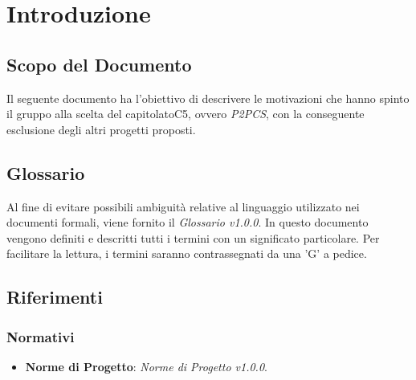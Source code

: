\section{Introduzione}
\subsection{Scopo del Documento}
	Il seguente documento ha l'obiettivo di descrivere le motivazioni che hanno spinto il gruppo alla scelta del capitolato\glosp C5, ovvero \textit{P2PCS}, con la conseguente esclusione degli altri progetti proposti.
	
\subsection{Glossario}
Al fine di evitare possibili ambiguità relative al linguaggio utilizzato nei documenti formali, viene fornito il \textit{Glossario v1.0.0}. In questo documento vengono definiti e descritti tutti i termini con un significato particolare. Per facilitare la lettura, i termini saranno contrassegnati da una 'G' a pedice.
	
\subsection{Riferimenti}
\subsubsection{Normativi}
\begin{itemize}
	\item \textbf{Norme di Progetto}: \textit{Norme di Progetto v1.0.0}.
\end{itemize}
	
